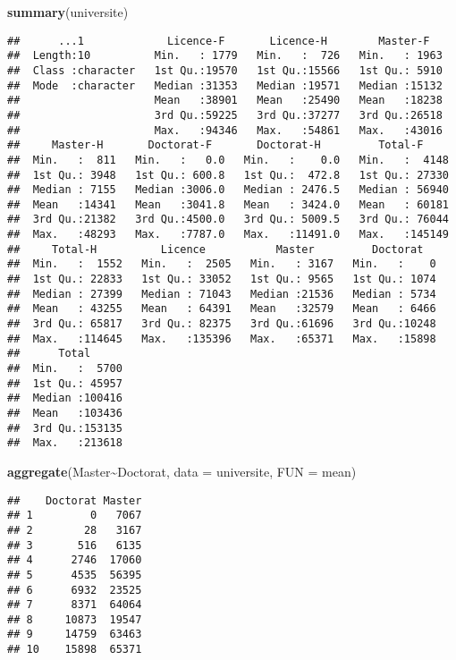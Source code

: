 \documentclass[
]{article}
\newenvironment{Shaded}{\begin{snugshade}}{\end{snugshade}}
\newcommand{\AttributeTok}[1]{\textcolor[rgb]{0.13,0.29,0.53}{#1}}
\newcommand{\FunctionTok}[1]{\textcolor[rgb]{0.13,0.29,0.53}{\textbf{#1}}}
\newcommand{\NormalTok}[1]{#1}
\newcommand{\SpecialCharTok}[1]{\textcolor[rgb]{0.81,0.36,0.00}{\textbf{#1}}}
\begin{document}
\begin{Shaded}
\begin{Highlighting}[]
\FunctionTok{summary}\NormalTok{(universite)}
\end{Highlighting}
\end{Shaded}

\begin{verbatim}
##      ...1             Licence-F       Licence-H        Master-F    
##  Length:10          Min.   : 1779   Min.   :  726   Min.   : 1963  
##  Class :character   1st Qu.:19570   1st Qu.:15566   1st Qu.: 5910  
##  Mode  :character   Median :31353   Median :19571   Median :15132  
##                     Mean   :38901   Mean   :25490   Mean   :18238  
##                     3rd Qu.:59225   3rd Qu.:37277   3rd Qu.:26518  
##                     Max.   :94346   Max.   :54861   Max.   :43016  
##     Master-H       Doctorat-F       Doctorat-H         Total-F      
##  Min.   :  811   Min.   :   0.0   Min.   :    0.0   Min.   :  4148  
##  1st Qu.: 3948   1st Qu.: 600.8   1st Qu.:  472.8   1st Qu.: 27330  
##  Median : 7155   Median :3006.0   Median : 2476.5   Median : 56940  
##  Mean   :14341   Mean   :3041.8   Mean   : 3424.0   Mean   : 60181  
##  3rd Qu.:21382   3rd Qu.:4500.0   3rd Qu.: 5009.5   3rd Qu.: 76044  
##  Max.   :48293   Max.   :7787.0   Max.   :11491.0   Max.   :145149  
##     Total-H          Licence           Master         Doctorat    
##  Min.   :  1552   Min.   :  2505   Min.   : 3167   Min.   :    0  
##  1st Qu.: 22833   1st Qu.: 33052   1st Qu.: 9565   1st Qu.: 1074  
##  Median : 27399   Median : 71043   Median :21536   Median : 5734  
##  Mean   : 43255   Mean   : 64391   Mean   :32579   Mean   : 6466  
##  3rd Qu.: 65817   3rd Qu.: 82375   3rd Qu.:61696   3rd Qu.:10248  
##  Max.   :114645   Max.   :135396   Max.   :65371   Max.   :15898  
##      Total       
##  Min.   :  5700  
##  1st Qu.: 45957  
##  Median :100416  
##  Mean   :103436  
##  3rd Qu.:153135  
##  Max.   :213618
\end{verbatim}

\begin{Shaded}
\begin{Highlighting}[]
\FunctionTok{aggregate}\NormalTok{(Master}\SpecialCharTok{\textasciitilde{}}\NormalTok{Doctorat, }\AttributeTok{data =}\NormalTok{ universite, }\AttributeTok{FUN =}\NormalTok{ mean)}
\end{Highlighting}
\end{Shaded}

\begin{verbatim}
##    Doctorat Master
## 1         0   7067
## 2        28   3167
## 3       516   6135
## 4      2746  17060
## 5      4535  56395
## 6      6932  23525
## 7      8371  64064
## 8     10873  19547
## 9     14759  63463
## 10    15898  65371
\end{verbatim}
\end{document}
